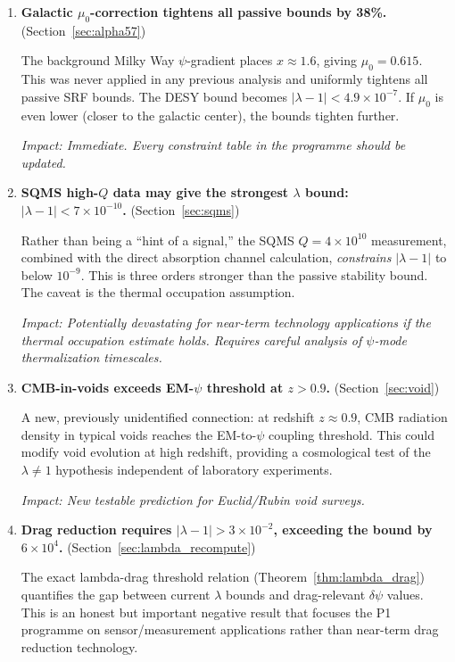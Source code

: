 \documentclass[11pt,twocolumn]{article}
\newcommand{\dpsi}{\delta\psi}
\newcommand{\lam}{\lambda}
\begin{document}
\begin{enumerate}

\item \textbf{Galactic $\mu_0$-correction tightens all passive bounds
by 38\%.} (Section~\ref{sec:alpha57})

The background Milky Way $\psi$-gradient places $x \approx 1.6$,
giving $\mu_0 = 0.615$. This was never applied in any previous analysis
and uniformly tightens all passive SRF bounds. The DESY bound becomes
$|\lam-1| < 4.9\times10^{-7}$. If $\mu_0$ is even lower (closer to
the galactic center), the bounds tighten further.

\emph{Impact: Immediate. Every constraint table in the programme should
be updated.}

\item \textbf{SQMS high-$Q$ data may give the strongest $\lam$ bound:
$|\lam-1| < 7\times10^{-10}$.} (Section~\ref{sec:sqms})

Rather than being a ``hint of a signal,'' the SQMS $Q = 4\times10^{10}$
measurement, combined with the direct absorption channel calculation,
\emph{constrains} $|\lam-1|$ to below $10^{-9}$. This is three orders
stronger than the passive stability bound. The caveat is the thermal
occupation assumption.

\emph{Impact: Potentially devastating for near-term technology applications
if the thermal occupation estimate holds. Requires careful analysis of
$\psi$-mode thermalization timescales.}

\item \textbf{CMB-in-voids exceeds EM-$\psi$ threshold at $z > 0.9$.}
(Section~\ref{sec:void})

A new, previously unidentified connection: at redshift $z \approx 0.9$,
CMB radiation density in typical voids reaches the EM-to-$\psi$
coupling threshold. This could modify void evolution at high redshift,
providing a cosmological test of the $\lam \neq 1$ hypothesis
independent of laboratory experiments.

\emph{Impact: New testable prediction for Euclid/Rubin void surveys.}

\item \textbf{Drag reduction requires $|\lam-1| > 3\times10^{-2}$,
exceeding the bound by $6\times10^4$.} (Section~\ref{sec:lambda_recompute})

The exact lambda-drag threshold relation (Theorem~\ref{thm:lambda_drag})
quantifies the gap between current $\lam$ bounds and drag-relevant
$\dpsi$ values. This is an honest but important negative result that
focuses the P1 programme on sensor/measurement applications rather than
near-term drag reduction technology.


\end{enumerate}
\end{document}
